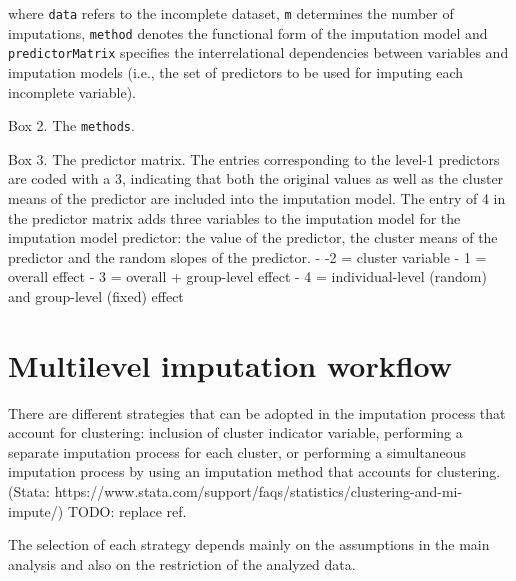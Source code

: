 \documentclass[
  article]{jss}
\begin{document}
where \texttt{data} refers to the incomplete dataset, \texttt{m}
determines the number of imputations, \texttt{method} denotes the
functional form of the imputation model and \texttt{predictorMatrix}
specifies the interrelational dependencies between variables and
imputation models (i.e., the set of predictors to be used for imputing
each incomplete variable).

\begin{tcolorbox}[enhanced jigsaw, toprule=.15mm, arc=.35mm, rightrule=.15mm, breakable, opacityback=0, bottomrule=.15mm, colback=white, leftrule=.75mm, left=2mm]

Box 2. The \texttt{methods}.

\end{tcolorbox}

\begin{tcolorbox}[enhanced jigsaw, toprule=.15mm, arc=.35mm, rightrule=.15mm, breakable, opacityback=0, bottomrule=.15mm, colback=white, leftrule=.75mm, left=2mm]

Box 3. The predictor matrix. The entries corresponding to the level-1
predictors are coded with a 3, indicating that both the original values
as well as the cluster means of the predictor are included into the
imputation model. The entry of 4 in the predictor matrix adds three
variables to the imputation model for the imputation model predictor:
the value of the predictor, the cluster means of the predictor and the
random slopes of the predictor. - -2 = cluster variable - 1 = overall
effect - 3 = overall + group-level effect - 4 = individual-level
(random) and group-level (fixed) effect

\end{tcolorbox}

\hypertarget{sec-workflow}{%
\section{Multilevel imputation workflow}\label{sec-workflow}}

There are different strategies that can be adopted in the imputation
process that account for clustering: inclusion of cluster indicator
variable, performing a separate imputation process for each cluster, or
performing a simultaneous imputation process by using an imputation
method that accounts for clustering.(Stata:
https://www.stata.com/support/faqs/statistics/clustering-and-mi-impute/)
TODO: replace ref.

The selection of each strategy depends mainly on the assumptions in the
main analysis and also on the restriction of the analyzed data.
\end{document}
